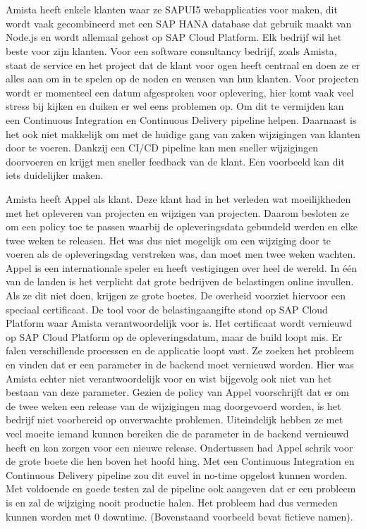 \section{}
\label{sec:probleemstelling}

Amista heeft enkele klanten waar ze SAPUI5 webapplicaties voor maken, dit wordt vaak gecombineerd met een SAP HANA database dat gebruik maakt van Node.js en wordt allemaal gehost op SAP Cloud Platform.
Elk bedrijf wil het beste voor zijn klanten. Voor een software consultancy bedrijf, zoals Amista, staat de service en het project dat de klant voor ogen heeft centraal en doen ze er alles aan om in te spelen op de noden en wensen van hun klanten.
Voor projecten wordt er momenteel een datum afgesproken voor oplevering, hier komt vaak veel stress bij kijken en duiken er wel eens problemen op. Om dit te vermijden kan een Continuous Integration en Continuous Delivery pipeline helpen. Daarnaast is het ook niet makkelijk om met de huidige gang van zaken wijzigingen van klanten door te voeren. Dankzij een CI/CD pipeline kan men sneller wijzigingen doorvoeren en krijgt men sneller feedback van de klant.
Een voorbeeld kan dit iets duidelijker maken.

Amista heeft Appel als klant. Deze klant had in het verleden wat moeilijkheden met het opleveren van projecten en wijzigen van projecten. Daarom besloten ze om een policy toe te passen waarbij de opleveringsdata gebundeld werden en elke twee weken te releasen. Het was dus niet mogelijk om een wijziging door te voeren als de opleveringsdag verstreken was, dan moet men twee weken wachten. 
Appel is een internationale speler en heeft vestigingen over heel de wereld. In één van de landen is het verplicht dat grote bedrijven de belastingen online invullen. Als ze dit niet doen, krijgen ze grote boetes. De overheid voorziet hiervoor een speciaal certificaat. De tool voor de belastingaangifte stond op SAP Cloud Platform waar Amista verantwoordelijk voor is. Het certificaat wordt vernieuwd op SAP Cloud Platform op de opleveringsdatum, maar de build loopt mis. Er falen verschillende processen en de applicatie loopt vast. Ze zoeken het probleem en vinden dat er een parameter in de backend moet vernieuwd worden. Hier was Amista echter niet verantwoordelijk voor en wist bijgevolg ook niet van het bestaan van deze parameter. Gezien de policy van Appel voorschrijft dat er om de twee weken een release van de wijzigingen mag doorgevoerd worden, is het bedrijf niet voorbereid op onverwachte problemen. Uiteindelijk hebben ze met veel moeite iemand kunnen bereiken die de parameter in de backend vernieuwd heeft en kon zorgen voor een nieuwe release. Ondertussen  had Appel schrik voor de grote boete die hen boven het hoofd hing.
Met een Continuous Integration en Continuous Delivery pipeline zou dit euvel in no-time opgelost kunnen worden. Met voldoende en goede testen zal de pipeline ook aangeven dat er een probleem is en zal de wijziging nooit productie halen. Het probleem had dus vermeden kunnen worden met 0 downtime.
(Bovenstaand voorbeeld bevat fictieve namen).


